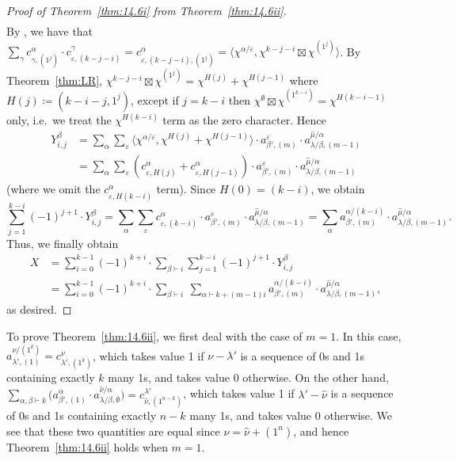 \documentclass[ALCO, Unicode]{cedram}
\begin{document}
\begin{proof}[Proof of Theorem~\ref{thm:14.6i} from Theorem~\ref{thm:14.6ii}]
\begin{align*}
	\end{align*}
	By \cite[(2.1)]{SLthesis}, we have that $\sum_\gamma c^\alpha_{\gamma,(1^j)}\cdot c^{\gamma}_{\varepsilon,(k-j-i)} = c^{\alpha}_{\varepsilon,(k-j-i),(1^j)} = \langle \chi^{\alpha/\varepsilon}, \chi^{k-j-i}\boxtimes \chi^{(1^j)}\rangle$. By Theorem~\ref{thm:LR}, $\chi^{k-j-i}\boxtimes \chi^{(1^j)} = \chi^{H(j)}+\chi^{H(j-1)}$ where $H(j)\coloneqq (k-i-j,1^j)$, except if $j=k-i$ then $\chi^\emptyset\boxtimes \chi^{(1^{k-i})}=\chi^{H(k-i-1)}$ only, i.e.~we treat the $\chi^{H(k-i)}$ term as the zero character. Hence
	\begin{align*}
		Y^\beta_{i,j} &= \sum_\alpha \sum_\varepsilon \langle \chi^{\alpha/\varepsilon}, \chi^{H(j)}+\chi^{H(j-1)}\rangle \cdot a^\varepsilon_{\beta',(m)}\cdot a^{\hat{\mu}/\alpha}_{\lambda/\beta,(m-1)}\\
		&= \sum_\alpha \sum_\varepsilon (c^\alpha_{\varepsilon,H(j)} + c^\alpha_{\varepsilon,H(j-1)}) \cdot a^\varepsilon_{\beta',(m)}\cdot a^{\hat{\mu}/\alpha}_{\lambda/\beta,(m-1)}
	\end{align*}
	(where we omit the $c^\alpha_{\varepsilon,H(k-i)}$ term). Since $H(0)=(k-i)$, we obtain
	\[ \sum_{j=1}^{k-i}(-1)^{j+1} \cdot Y^\beta_{i,j} = \sum_\alpha \sum_\varepsilon c^\alpha_{\varepsilon,(k-i)}\cdot a^\varepsilon_{\beta',(m)}\cdot a^{\hat{\mu}/\alpha}_{\lambda/\beta,(m-1)} = \sum_\alpha a^{\alpha/(k-i)}_{\beta',(m)}\cdot a^{\hat{\mu}/\alpha}_{\lambda/\beta,(m-1)}.\]
	Thus, we finally obtain
	\begin{align*} X &= \sum_{i=0}^{k-1}(-1)^{k+i} \cdot \sum_{\beta\vdash i} \sum_{j=1}^{k-i}(-1)^{j+1}\cdot Y^\beta_{i,j} \\&= \sum_{i=0}^{k-1}(-1)^{k+i}\cdot \sum_{\beta\vdash i}\ \sum_{\alpha\vdash k+(m-1)i} a^{\alpha/(k-i)}_{\beta',(m)}\cdot a^{\hat{\mu}/\alpha}_{\lambda/\beta,(m-1)}, \end{align*}
	as desired.
\end{proof}

To prove Theorem~\ref{thm:14.6ii}, we first deal with the case of $m=1$. In this case, $a^{\nu/(1^k)}_{\lambda',(1)} = c^{\nu}_{\lambda',(1^k)}$, which takes value 1 if $\nu-\lambda'$ is a sequence of 0s and 1s containing exactly $k$ many 1s, and takes value 0 otherwise. On the other hand, $\sum_{\alpha,\beta\vdash k} \big(a^\alpha_{\beta',(1)}\cdot a^{\hat{\nu}/\alpha}_{\lambda/\beta,\emptyset}\big)=c^{\lambda'}_{\hat{\nu},(1^{n-k})}$, which takes value 1 if $\lambda'-\hat{\nu}$ is a sequence of 0s and 1s containing exactly $n-k$ many 1s, and takes value 0 otherwise. We see that these two quantities are equal since $\nu=\hat{\nu}+(1^n)$, and hence Theorem~\ref{thm:14.6ii} holds when $m=1$. 
\end{document}
